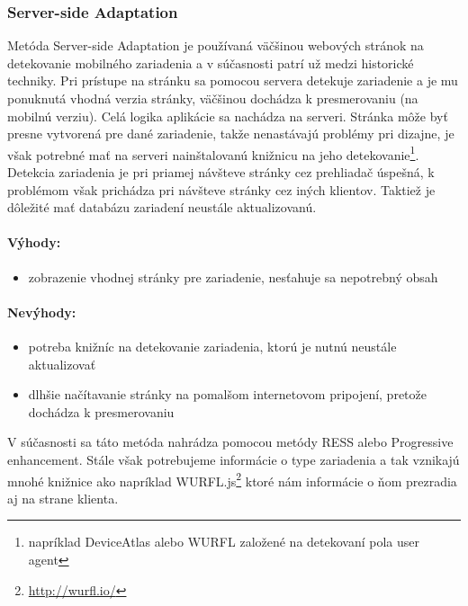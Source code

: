 

\subsubsection{Server-side Adaptation} %
\label{ssub:ress_}

Metóda Server-side Adaptation je používaná väčšinou webových stránok na detekovanie mobilného zariadenia a v súčasnosti patrí už medzi historické techniky. Pri prístupe na stránku sa pomocou servera detekuje zariadenie a je mu ponuknutá vhodná verzia stránky, väčšinou dochádza k presmerovaniu (na mobilnú verziu). Celá logika aplikácie sa nachádza na serveri. Stránka môže byť presne vytvorená pre dané zariadenie, takže nenastávajú problémy pri dizajne, je však potrebné mať na serveri nainštalovanú knižnicu na jeho detekovanie\footnote{napríklad DeviceAtlas alebo WURFL založené na detekovaní pola user agent}. Detekcia zariadenia je pri priamej návšteve stránky cez prehliadač úspešná, k problémom však prichádza pri návšteve stránky cez iných klientov. Taktiež je dôležité mať databázu zariadení neustále aktualizovanú.

\paragraph{Výhody:}
\begin{itemize}
	\item zobrazenie vhodnej stránky pre zariadenie, nesťahuje sa nepotrebný obsah
\end{itemize}

\paragraph{Nevýhody:}
\begin{itemize}
	\item potreba knižníc na detekovanie zariadenia, ktorú je nutnú neustále aktualizovať
	\item dlhšie načítavanie stránky na pomalšom internetovom pripojení, pretože dochádza k presmerovaniu
\end{itemize}

V súčasnosti sa táto metóda nahrádza pomocou metódy RESS alebo Progressive enhancement. Stále však potrebujeme informácie o type zariadenia a tak vznikajú mnohé knižnice ako napríklad WURFL.js\footnote{\url{http://wurfl.io/}} ktoré nám informácie o ňom prezradia aj na strane klienta.

